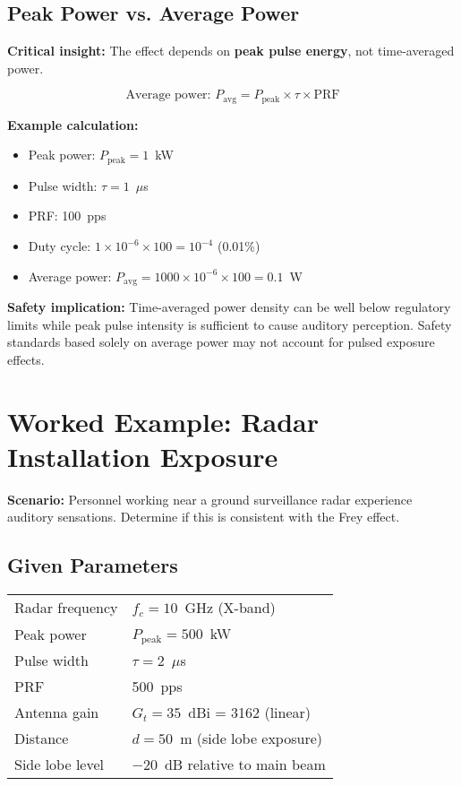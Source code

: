 \subsection{Peak Power vs. Average Power}

\textbf{Critical insight:} The effect depends on \textbf{peak pulse energy}, not time-averaged power.

\begin{equation}
\text{Average power: } P_{\text{avg}} = P_{\text{peak}} \times \tau \times \text{PRF}
\label{eq:frey-avg-power}
\end{equation}

\textbf{Example calculation:}
\begin{itemize}
\item Peak power: $P_{\text{peak}} = 1$~kW
\item Pulse width: $\tau = 1$~$\mu$s
\item PRF: 100~pps
\item Duty cycle: $1 \times 10^{-6} \times 100 = 10^{-4}$ (0.01\%)
\item Average power: $P_{\text{avg}} = 1000 \times 10^{-6} \times 100 = 0.1$~W
\end{itemize}

\begin{warningbox}
\textbf{Safety implication:} Time-averaged power density can be well below regulatory limits while peak pulse intensity is sufficient to cause auditory perception. Safety standards based solely on average power may not account for pulsed exposure effects.
\end{warningbox}

\section{Worked Example: Radar Installation Exposure}

\textbf{Scenario:} Personnel working near a ground surveillance radar experience auditory sensations. Determine if this is consistent with the Frey effect.

\subsection*{Given Parameters}

\begin{tabular}{@{}ll@{}}
Radar frequency & $f_c = 10$~GHz (X-band) \\
Peak power & $P_{\text{peak}} = 500$~kW \\
Pulse width & $\tau = 2$~$\mu$s \\
PRF & 500~pps \\
Antenna gain & $G_t = 35$~dBi = 3162 (linear) \\
Distance & $d = 50$~m (side lobe exposure) \\
Side lobe level & $-20$~dB relative to main beam \\
\end{tabular}


